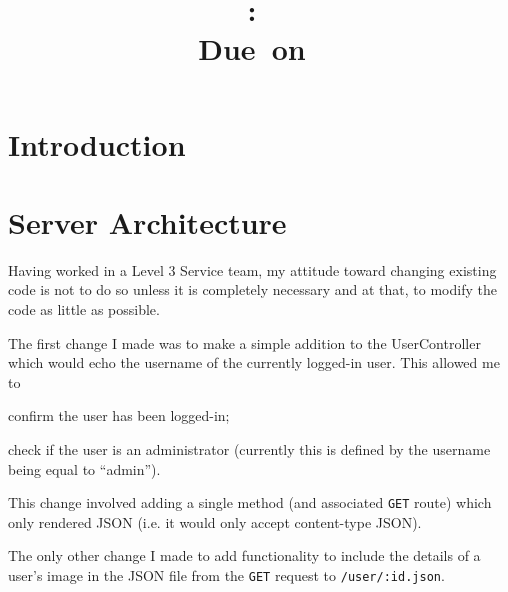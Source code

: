 \documentclass{article}
\title{
\vspace{2in}
\textmd{\textbf{\hmwkClass:\ \hmwkTitle}}\\
\normalsize\vspace{0.1in}\small{Due\ on\ \hmwkDueDate}\\
\vspace{3in}
}
\author{\textbf{\hmwkAuthorName}}
\date{} %
\begin{document}
\maketitle



\newpage
\tableofcontents
\newpage


\section{Introduction}



\clearpage
\section{Server Architecture}
\label{sec:server}
Having worked in a Level 3 Service team, my attitude toward changing existing code is not
to do so unless it is completely necessary and at that, to modify the code as little as
possible.

The first change I made was to make a simple addition to the UserController which would
echo the username of the currently logged-in user. This allowed me to
\begin{inparaenum}
\item confirm the user has been logged-in;
\item check if the user is an administrator (currently this is defined by the username
being equal to ``admin'').
\end{inparaenum}

This change involved adding a single method (and associated \verb$GET$ route) which only rendered
JSON (i.e. it would only accept content-type JSON).

The only other change I made to add functionality to include the details of a user's
image in the JSON file from the \verb$GET$ request to \verb$/user/:id.json$. 
\end{document}
